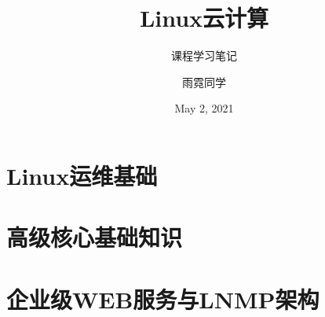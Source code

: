 \documentclass[cn,10pt]{elegantbook}
\title{Linux云计算}
\subtitle{课程学习笔记}
\author{雨霓同学}
\institute{Azurekite}
\date{May 2, 2021}
\begin{document}
\maketitle



\tableofcontents
\mainmatter

\part{Linux运维基础}


%
%
%
\part{高级核心基础知识}

%
%
%
%
%

\part{企业级WEB服务与LNMP架构}

\end{document}
